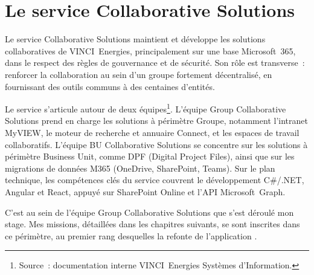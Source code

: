 \section{Le service Collaborative Solutions}
\label{sec:collab-solutions}

Le service Collaborative Solutions maintient et développe les solutions
collaboratives de VINCI~Energies, principalement sur une base
Microsoft~365, dans le respect des règles de gouvernance et de
sécurité. Son rôle est transverse~: renforcer la collaboration au sein d'un
groupe fortement décentralisé, en fournissant des outils communs à des
centaines d'entités.

Le service s'articule autour de deux équipes\footnote{Source~: documentation
interne VINCI~Energies Systèmes d'Information.}. L'équipe Group
Collaborative Solutions prend en charge les solutions à périmètre Groupe,
notamment l'intranet MyVIEW, le moteur de recherche et annuaire
Connect, et les espaces de travail collaboratifs. L'équipe
BU Collaborative Solutions se concentre sur les solutions à périmètre
Business Unit, comme DPF (Digital Project Files), ainsi que sur les
migrations de données M365 (OneDrive, SharePoint, Teams). Sur le plan
technique, les compétences clés du service couvrent le développement
C\#/.NET, Angular et React, appuyé sur SharePoint Online et l'API
Microsoft~Graph.

C'est au sein de l'équipe Group Collaborative Solutions que s'est
déroulé mon stage. Mes missions, détaillées dans les chapitres suivants, se
sont inscrites dans ce périmètre, au premier rang desquelles la refonte de
l'application \csbag.

